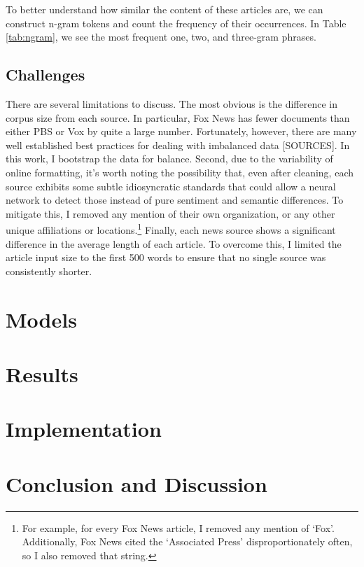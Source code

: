 \documentclass{article}
\begin{document}
	    To better understand how similar the content of these articles are, we can construct n-gram tokens and count the frequency of their occurrences. In Table \ref{tab:ngram}, we see the most frequent one, two, and three-gram phrases. 
	    
	    
	    
	\subsection{Challenges}
	    There are several limitations to discuss. The most obvious is the difference in corpus size from each source. In particular, Fox News has fewer documents than either PBS or Vox by quite a large number. Fortunately, however, there are many well established best practices for dealing with imbalanced data [SOURCES]. In this work, I bootstrap the data for balance. Second, due to the variability of online formatting, it's worth noting the possibility that, even after cleaning, each source exhibits some subtle idiosyncratic standards that could allow a neural network to detect those instead of pure sentiment and semantic differences. To mitigate this, I removed any mention of their own organization, or any other unique affiliations or locations.\footnote{For example, for every Fox News article, I removed any mention of `Fox'. Additionally, Fox News cited the `Associated Press' disproportionately often, so I also removed that string.} Finally, each news source shows a significant difference in the average length of each article. To overcome this, I limited the article input size to the first 500 words to ensure that no single source was consistently shorter. 
	    	
	\section{Models}
	
	    
	
	\section{Results}
	
	\section{Implementation}
	
	\section{Conclusion and Discussion}
	
\end{document}
